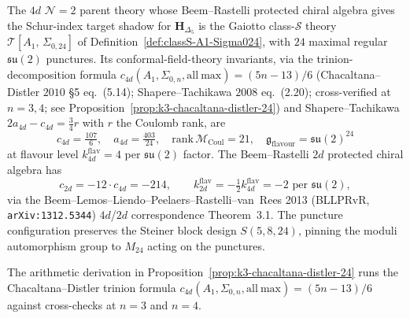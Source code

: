 \begin{theorem}
\label{thm:k3-classS-4d-parent}
The $4d$ $\mathcal{N}=2$ parent theory whose Beem--Rastelli protected chiral
algebra gives the Schur-index target shadow for $\mathbf{H}_{\Delta_5}$ is the Gaiotto
class-$\mathcal{S}$ theory $\mathcal{T}[A_1,\,\Sigma_{0,24}]$ of
Definition~\ref{def:classS-A1-Sigma024}, with $24$ maximal regular
$\mathfrak{su}(2)$ punctures. Its conformal-field-theory invariants,
via the trinion-decomposition formula
$c_{4d}(A_1,\Sigma_{0,n},\mathrm{all\ max}) = (5 n - 13)/6$
(Chacaltana--Distler $2010$ \S5 eq.~(5.14); Shapere--Tachikawa $2008$
eq.~(2.20); cross-verified at $n = 3, 4$; see
Proposition~\ref{prop:k3-chacaltana-distler-24}) and
Shapere--Tachikawa $2 a_{4d} - c_{4d} = \tfrac{3}{4} r$ with $r$ the
Coulomb rank, are
\begin{equation}
 c_{4d} = \tfrac{107}{6},\quad
 a_{4d} = \tfrac{403}{24},\quad
 \mathrm{rank}\,\mathcal{M}_{\mathrm{Coul}} = 21,\quad
 \mathfrak{g}_{\mathrm{flavour}} = \mathfrak{su}(2)^{24}
 \label{eq:classS-central-charges}
\end{equation}
at flavour level $k_{4d}^{\mathrm{flav}} = 4$ per $\mathfrak{su}(2)$
factor. The Beem--Rastelli $2d$ protected chiral algebra has
\begin{equation}
 c_{2d} = -12\cdot c_{4d} = -214,
 \qquad
 k_{2d}^{\mathrm{flav}} = -\tfrac{1}{2}k_{4d}^{\mathrm{flav}} = -2
 \text{ per }\mathfrak{su}(2),
 \label{eq:BR-2d-charges}
\end{equation}
via the Beem--Lemos--Liendo--Peelaers--Rastelli--van~Rees 2013 (BLLPRvR,
\texttt{arXiv:1312.5344}) $4d$/$2d$ correspondence Theorem~3.1. The
puncture configuration preserves the Steiner block design $S(5,8,24)$,
pinning the moduli automorphism group to $M_{24}$ acting on the
punctures.

The arithmetic derivation in Proposition~\ref{prop:k3-chacaltana-distler-24}
runs the Chacaltana--Distler trinion formula
$c_{4d}(A_1, \Sigma_{0,n}, \mathrm{all\ max}) = (5n - 13)/6$ against
cross-checks at $n = 3$ and $n = 4$.
\end{theorem}

